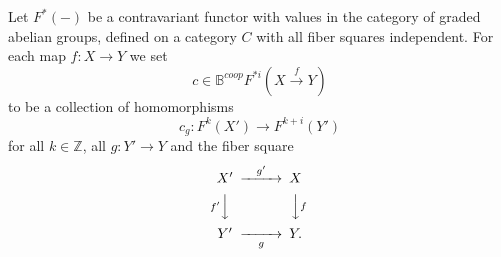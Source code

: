 \documentclass[a4paper]{amsart}
\begin{document}
\begin{thm}
Let $F^*(-)$ be a contravariant functor with values in the category of graded abelian groups, defined on a category $C$ with all fiber squares independent.
For each %
map $f:X \to Y$ we set
$$ c \in \mathbb B^{coop}F^{* i}(X \xrightarrow f Y)$$
to be a collection of %
homomorphisms
$$c_g: F^k(X') \to F^{k+i}(Y')$$
for all $k \in \mathbb Z$, all $g:Y' \to Y$  and the fiber square \, \, \, 
$$\CD
X' @> {g'}  >> X\\
@V {f'} VV @VV fV\\
Y' @>> {g} > Y.\\
\endCD
$$ \, \, \, 


\end{thm}
\end{document}
